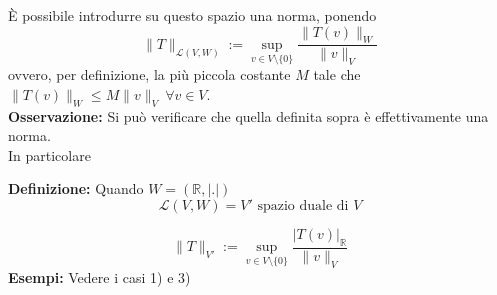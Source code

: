 \documentclass[a4paper]{article}
\newcommand{\R}{\mathbb{R}}
\begin{document}
È possibile introdurre su questo spazio una norma, ponendo 
\[\|T\|_{\mathcal L(V,W)}:=\sup_{v\in V\setminus \{0\} }\frac{\|T(v)\|_W}{\|v\|_V}\]
ovvero, per definizione, la più piccola costante $M$ tale che $\|T(v)\|_W\le M \|v\|_V\ \forall v\in V$.
\\\textbf{Osservazione:} Si può verificare che quella definita sopra è effettivamente una norma.\\
In particolare
\begin{tcolorbox}
	\textbf{Definizione: }Quando $W=(\R,|.|)$ 
	\[\mathcal L (V,W)=V'\text{ spazio duale di }V\]
\end{tcolorbox}
\[\|T\|_{V'}:=\sup_{v\in V\setminus \{0\} } \frac{|T(v)|_{\R}}{\|v\|_V}\]
\textbf{Esempi: }Vedere i casi 1) e 3)
\end{document}
